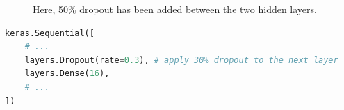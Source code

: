 \begin{figure}[htp]
	\centering
	\caption{Here, 50\% dropout has been added between the two hidden layers.}
\end{figure}

\begin{lstlisting}[language=Python]
keras.Sequential([
    # ...
    layers.Dropout(rate=0.3), # apply 30% dropout to the next layer
    layers.Dense(16),
    # ...
])
\end{lstlisting}


